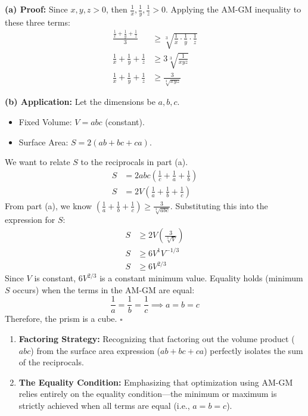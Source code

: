 \begin{solution}
\textbf{(a) Proof:}
Since $x, y, z > 0$, then $\frac{1}{x}, \frac{1}{y}, \frac{1}{z} > 0$.
Applying the AM-GM inequality to these three terms:
\begin{align*}
    \frac{\frac{1}{x} + \frac{1}{y} + \frac{1}{z}}{3} &\ge \sqrt[3]{\frac{1}{x} \cdot \frac{1}{y} \cdot \frac{1}{z}} \\
    \frac{1}{x} + \frac{1}{y} + \frac{1}{z} &\ge 3 \sqrt[3]{\frac{1}{xyz}} \\
    \frac{1}{x} + \frac{1}{y} + \frac{1}{z} &\ge \frac{3}{\sqrt[3]{xyz}}
\end{align*}

\textbf{(b) Application:}
Let the dimensions be $a,b,c$.
\begin{itemize}
    \item Fixed Volume: $V = abc$ (constant).
    \item Surface Area: $S = 2(ab + bc + ca)$.
\end{itemize}

We want to relate $S$ to the reciprocals in part (a).
\begin{align*}
    S &= 2abc \left( \frac{1}{c} + \frac{1}{a} + \frac{1}{b} \right) \\
    S &= 2V \left( \frac{1}{a} + \frac{1}{b} + \frac{1}{c} \right)
\end{align*}
From part (a), we know $\left( \frac{1}{a} + \frac{1}{b} + \frac{1}{c} \right) \ge \frac{3}{\sqrt[3]{abc}}$.
Substituting this into the expression for $S$:
\begin{align*}
    S &\ge 2V \left( \frac{3}{\sqrt[3]{V}} \right) \\
    S &\ge 6 V^{1} V^{-1/3} \\
    S &\ge 6 V^{2/3}
\end{align*}
Since $V$ is constant, $6V^{2/3}$ is a constant minimum value.
Equality holds (minimum $S$ occurs) when the terms in the AM-GM are equal:
\[ \frac{1}{a} = \frac{1}{b} = \frac{1}{c} \implies a = b = c \]
Therefore, the prism is a cube. \hfill $\square$
\end{solution}

\begin{takeaways}
\begin{enumerate}
    \item \textbf{Factoring Strategy:} Recognizing that factoring out the volume product ($abc$) from the surface area expression ($ab+bc+ca$) perfectly isolates the sum of the reciprocals.

    \item \textbf{The Equality Condition:} Emphasizing that optimization using AM-GM relies entirely on the equality condition—the minimum or maximum is strictly achieved when all terms are equal (i.e., $a=b=c$).
\end{enumerate}
\end{takeaways}

